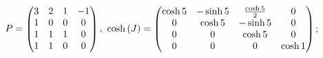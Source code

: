 	\begin{enumsolsfull}

		\label{sol:linsys_funcs:matrixAt}
		\item \( P = \begin{pmatrix} 3 & 2 & 1 & -1 \\ 1 & 0 & 0 & 0 \\ 1 & 1 & 1 & 0 \\ 1 & 1 & 0 & 0 \end{pmatrix}, ~ \cosh \left( J \right) = \begin{pmatrix} \cosh{5} & -\sinh{5} & \frac{\cosh{5}}{2} & 0 \\ 0 & \cosh{5} & -\sinh{5} & 0 \\ 0 & 0 & \cosh{5} & 0 \\ 0 & 0 & 0 & \cosh{1} \end{pmatrix} \); %

\end{enumsolsfull}
